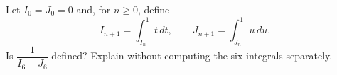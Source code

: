 Let $I_0=J_0=0$ and, for $n\ge0$, define
\[I_{n+1}=\int_{I_n}^1t\,dt,\qquad J_{n+1}=\int_{J_n}^1u\,du.\]
Is $\dfrac{1}{I_6-J_6}$ defined? Explain without computing the six integrals separately.
